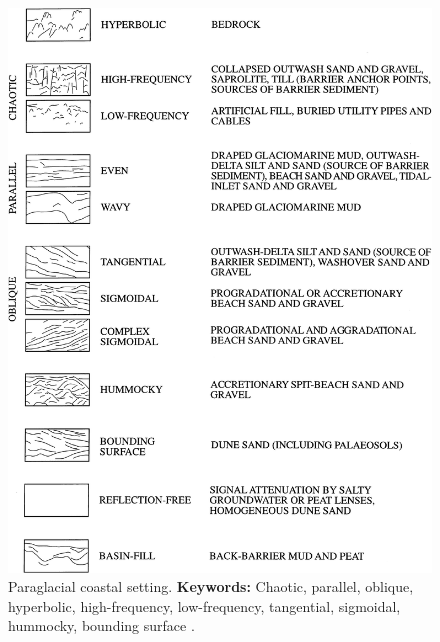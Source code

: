 \begin{figure}[h!]
    \centering
    \includegraphics[width=0.9\linewidth]{Figures/0.2GPR/VanHeteren_1998_Coastal.png}
    \caption[Paraglacial coastal setting.]{Paraglacial coastal setting. \textbf{Keywords: } Chaotic, parallel, oblique, hyperbolic, high-frequency, low-frequency, tangential, sigmoidal, hummocky, bounding surface \citep{VanHeteren1998}.}
    \label{fig:VanHeteren1998-1}
\end{figure}
